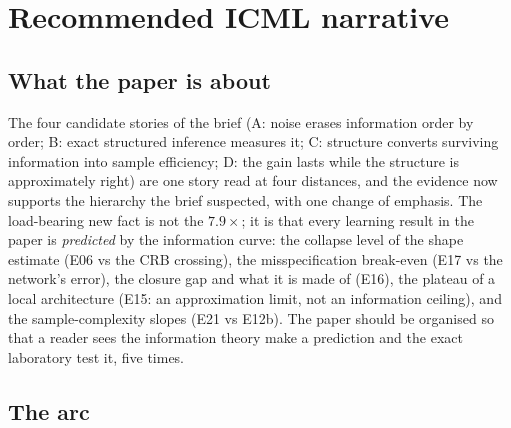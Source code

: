 \section{Recommended ICML narrative}
\label{sec:narrative}

\subsection{What the paper is about}

The four candidate stories of the brief (A: noise erases information order by order; B: exact structured inference measures it; C: structure converts surviving information into sample efficiency; D: the gain lasts while the structure is approximately right) are one story read at four distances, and the evidence now supports the hierarchy the brief suspected, with one change of emphasis. The load-bearing new fact is not the $7.9\times$; it is that every learning result in the paper is \emph{predicted} by the information curve: the collapse level of the shape estimate (E06 vs the CRB crossing), the misspecification break-even (E17 vs the network's error), the closure gap and what it is made of (E16), the plateau of a local architecture (E15: an approximation limit, not an information ceiling), and the sample-complexity slopes (E21 vs E12b). The paper should be organised so that a reader sees the information theory make a prediction and the exact laboratory test it, five times.

\subsection{The arc}

